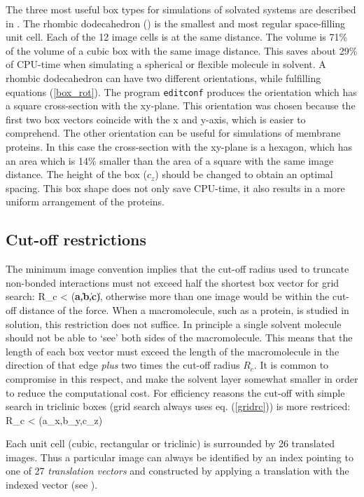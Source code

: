 The three most useful box types for simulations of solvated systems are
described in .
The rhombic dodecahedron () is the smallest and most regular
space-filling unit cell. Each of the 12 image cells is at the same distance.
The volume is 71\% of the volume of a cubic box with the same image
distance. This saves about 29\% of CPU-time when simulating a spherical or
flexible molecule in solvent. A rhombic dodecahedron can have two different
orientations, while fulfilling equations (\ref{box_rot}).
The program {\tt editconf} produces the orientation which has a square
cross-section with the xy-plane.
This orientation was chosen because the first two box vectors coincide with the
x and y-axis, which is easier to comprehend. The other orientation can be
useful for simulations of membrane proteins. In this case the cross-section
with the xy-plane is a hexagon, which has an area which is 14\% smaller than
the area of a square with the same image distance.
The height of the box ($c_z$) should be changed to obtain an optimal spacing.
This box shape does not only save CPU-time,
it also results in a more uniform arrangement of the proteins.

\subsection{Cut-off restrictions}
The minimum image convention implies that the cut-off radius used to
truncate non-bonded interactions must not exceed half the shortest box
vector for grid search:
\beq
\label{gridrc}
  R_c < \half \min(\|{\bf a}\|,\|{\bf b}\|,\|{\bf c}\|),
\eeq
otherwise more than one image would be within the cut-off distance of
the force. When a macromolecule, such as a protein, is studied in
solution,  this restriction does not suffice. In principle a single
solvent  molecule should not be able
to `see' both sides of the macromolecule. This means that the length of
each box vector must exceed the length of the macromolecule in the
direction of that edge {\em plus} two times the cut-off radius $R_c$.
It is common to compromise in this respect, and make the solvent layer
somewhat smaller in order to reduce the computational cost.
For efficiency reasons the cut-off with simple search in triclinic boxes
(grid search always uses eq. (\ref{gridrc})) is more restriced:
\beq
\label{simplerc}
R_c < \half \min(a_x,b_y,c_z)
\eeq

Each unit cell (cubic, rectangular or triclinic)
is surrounded by 26 translated images. Thus a
particular image can always be identified by an index pointing to one
of 27 {\em translation vectors} and constructed by applying a
translation with the indexed vector (see ).


